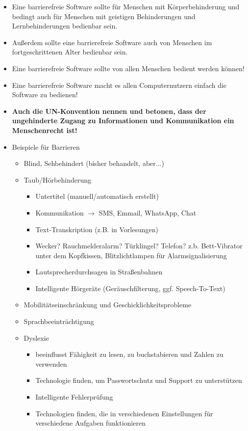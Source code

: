 \documentclass[paper=a4, fontsize=11pt]{scrartcl} %
\numberwithin{equation}{section} %
\numberwithin{figure}{section} %
\numberwithin{table}{section} %
\begin{document}
\begin{itemize}
\item Eine barrierefreie Software sollte für Menschen mit Körperbehinderung und bedingt auch für Menschen mit geistigen Behinderungen und Lernbehinderungen bedienbar sein.
\item Außerdem sollte eine barrierefreie Software auch von Menschen im fortgeschrittenen Alter bedienbar sein.
\item Eine barrierefreie Software sollte von allen Menschen bedient werden können!
\item Eine barrierefreie Software macht es allen Computernutzern einfach die Software zu bedienen!
\item \textbf{Auch die UN-Konvention nennen und betonen, dass der ungehinderte Zugang zu Informationen und Kommunikation ein Menschenrecht ist!}
\item Beispiele für Barrieren
\begin{itemize}
\item Blind, Sehbehindert (bisher behandelt, aber...)
\item Taub/Hörbehinderung
\begin{itemize}
\item Untertitel (manuell/automatisch erstellt)
\item Kommunikation $\rightarrow$ SMS, Emmail, WhatsApp, Chat
\item Text-Transkription (z.B. in Vorlesungen)
\item Wecker? Rauchmelderalarm? Türklingel? Telefon? z.b. Bett-Vibrator unter dem Kopfkissen, Blitzlichtlampen für Alarmsignalisierung
\item Lautsprecherdurchsagen in Straßenbahnen
\item Intelligente Hörgeräte (Geräuschfilterung, ggf. Speech-To-Text)
\end{itemize}
\item Mobilitätseinschränkung und Geschicklichkeitsprobleme
\item Sprachbeeinträchtigung
\item Dyslexie
\begin{itemize}
\item beeinflusst Fähigkeit zu lesen, zu buchstabieren und Zahlen zu verwenden
\item Technologie finden, um Passwortschutz und Support zu unterstützen
\item Intelligente Fehlerprüfung
\item Technologien finden, die in verschiedenen Einstellungen für verschiedene Aufgaben funktionieren

\end{itemize}
\end{itemize}
\end{itemize}
\end{document}
